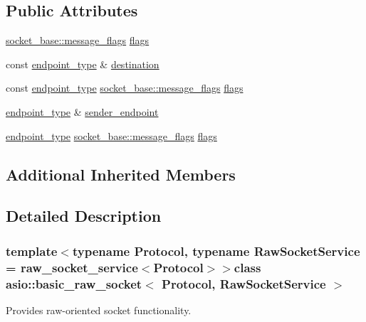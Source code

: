 \subsection*{Public Attributes}
\begin{DoxyCompactItemize}
\item 
\hyperlink{classasio_1_1socket__base_ac3cf77465dfedfe1979b5415cf32cc94}{socket\+\_\+base\+::message\+\_\+flags} \hyperlink{classasio_1_1basic__raw__socket_a324289af06e6526b244c1074db009c3f}{flags}
\item 
const \hyperlink{classasio_1_1basic__raw__socket_a75803815223ab2cbfa66c51a650236b5}{endpoint\+\_\+type} \& \hyperlink{classasio_1_1basic__raw__socket_ad4085e3f776b88e9f818fd8f34295ecb}{destination}
\item 
const \hyperlink{classasio_1_1basic__raw__socket_a75803815223ab2cbfa66c51a650236b5}{endpoint\+\_\+type} \hyperlink{classasio_1_1socket__base_ac3cf77465dfedfe1979b5415cf32cc94}{socket\+\_\+base\+::message\+\_\+flags} \hyperlink{classasio_1_1basic__raw__socket_a44b3b4dcf3cad67bb4240f6bd2fb4a39}{flags}
\item 
\hyperlink{classasio_1_1basic__raw__socket_a75803815223ab2cbfa66c51a650236b5}{endpoint\+\_\+type} \& \hyperlink{classasio_1_1basic__raw__socket_aa2e1f2e9f86892704225b64abe99c528}{sender\+\_\+endpoint}
\item 
\hyperlink{classasio_1_1basic__raw__socket_a75803815223ab2cbfa66c51a650236b5}{endpoint\+\_\+type} \hyperlink{classasio_1_1socket__base_ac3cf77465dfedfe1979b5415cf32cc94}{socket\+\_\+base\+::message\+\_\+flags} \hyperlink{classasio_1_1basic__raw__socket_a66abaa42609bd5723f723050d869ea8c}{flags}
\end{DoxyCompactItemize}
\subsection*{Additional Inherited Members}


\subsection{Detailed Description}
\subsubsection*{template$<$typename Protocol, typename Raw\+Socket\+Service = raw\+\_\+socket\+\_\+service$<$\+Protocol$>$$>$class asio\+::basic\+\_\+raw\+\_\+socket$<$ Protocol, Raw\+Socket\+Service $>$}

Provides raw-\/oriented socket functionality. 

